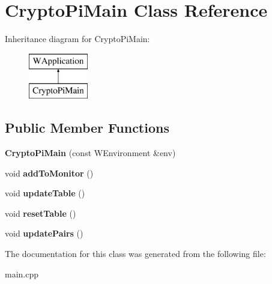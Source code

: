\hypertarget{class_crypto_pi_main}{}\section{Crypto\+Pi\+Main Class Reference}
\label{class_crypto_pi_main}
Inheritance diagram for Crypto\+Pi\+Main\+:\begin{figure}[H]
\begin{center}
\leavevmode
\includegraphics[height=2.000000cm]{class_crypto_pi_main}
\end{center}
\end{figure}
\subsection*{Public Member Functions}
\begin{DoxyCompactItemize}
\item 
\mbox{\label{class_crypto_pi_main_ae9442747c64ce69b2369676ec2c86b9b}} 
{\bfseries Crypto\+Pi\+Main} (const W\+Environment \&env)
\item 
\mbox{\label{class_crypto_pi_main_af6ca0336b4524e3452ffcd5780c9b565}} 
void {\bfseries add\+To\+Monitor} ()
\item 
\mbox{\label{class_crypto_pi_main_ad643e4cae4cd1d700f608bf88c9fd510}} 
void {\bfseries update\+Table} ()
\item 
\mbox{\label{class_crypto_pi_main_acf1d22cffa5010a1010264e6ba2ad1a3}} 
void {\bfseries reset\+Table} ()
\item 
\mbox{\label{class_crypto_pi_main_ab6c8cbfd39ee446905e4c7ed8f5b6d98}} 
void {\bfseries update\+Pairs} ()
\end{DoxyCompactItemize}


The documentation for this class was generated from the following file\+:\begin{DoxyCompactItemize}
\item 
main.\+cpp\end{DoxyCompactItemize}
